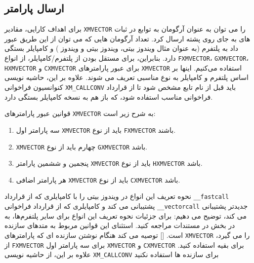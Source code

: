 \subsection{\textbf{ارسال پارامتر}}
{
    \Large
    \begin{spacing}{1.5}
        برای اهداف کارایی، مقادیر \texttt{XMVECTOR} را می توان به عنوان آرگومان به توابع در ثبات های  به جای روی پشته ارسال کرد.
        تعداد آرگومان هایی که می توان از این طریق عبور داد به پلتفرم (به عنوان مثال ویندوز  بیتی، ویندوز  بیتی و ویندوز ) و کامپایلر بستگی دارد.
        بنابراین، برای مستقل بودن از پلتفرم/کامپایلر، از انواع \texttt{FXMVECTOR}، \texttt{GXMVECTOR}، \texttt{HXMVECTOR} و \texttt{CXMVECTOR} برای عبور پارامترهای \texttt{XMVECTOR} استفاده می‌کنیم.
        اینها بر اساس پلتفرم و کامپایلر به نوع مناسبی تعریف می شوند.
        علاوه بر این، حاشیه نویسی کنوانسیون فراخوانی \texttt{XM\_CALLCONV} باید قبل از نام تابع مشخص شود تا از قرارداد فراخوانی مناسب استفاده شود،
        که باز هم به نسخه کامپایلر بستگی دارد.

        قوانین عبور پارامترهای \texttt{XMVECTOR} به شرح زیر است:
        \begin{enumerate}
            \item {سه پارامتر اول \texttt{XMVECTOR} باید از نوع \texttt{FXMVECTOR} باشند.}
            \item {\texttt{XMVECTOR} چهارم باید از نوع \texttt{GXMVECTOR} باشد.}
            \item {پنجمین و ششمین پارامتر \texttt{XMVECTOR} باید از نوع \texttt{HXMVECTOR} باشد.}
            \item {هر پارامتر اضافی \texttt{XMVECTOR} باید از نوع \texttt{CXMVECTOR} باشد.}
        \end{enumerate}

        نحوه تعریف این انواع در ویندوز  بیتی را با کامپایلری که از قرارداد \texttt{\_\_fastcall} پشتیبانی می کند و
        کامپایلری که از قرارداد فراخوانی \texttt{\_\_vectorcall} جدیدتر پشتیبانی می کند، توضیح می دهیم:
        \textbf{\vspace{6pt}}
        \lr{}
        \textbf{\vspace{6pt}}
        برای جزئیات نحوه تعریف این انواع برای سایر پلتفرم‌ها، به  در بخش  در مستندات  مراجعه کنید.
        استثنای این قوانین مربوط به متدهای سازنده است. [] توصیه می کند هنگام نوشتن سازنده ای که پارامترهای \texttt{XMVECTOR} را می گیرد،
        از \texttt{FXMVECTOR} برای سه پارامتر اول \texttt{XMVECTOR} و \texttt{CXMVECTOR} برای بقیه استفاده کنید.
        علاوه بر این، از حاشیه نویسی \texttt{XM\_CALLCONV} برای سازنده ها استفاده نکنید


\end{spacing}}
